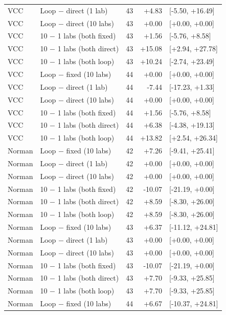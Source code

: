 \begin{longtable}{llrrl}
VCC & Loop $-$ direct (1 lab) & 43 & +4.83 & [-5.50, +16.49] \\
VCC & Loop $-$ direct (10 labs) & 43 & +0.00 & [+0.00, +0.00] \\
VCC & 10 $-$ 1 labs (both fixed) & 43 & +1.56 & [-5.76, +8.58] \\
VCC & 10 $-$ 1 labs (both direct) & 43 & +15.08 & [+2.94, +27.78] \\
VCC & 10 $-$ 1 labs (both loop) & 43 & +10.24 & [-2.74, +23.49] \\
\midrule
VCC & Loop $-$ fixed (10 labs) & 44 & +0.00 & [+0.00, +0.00] \\
VCC & Loop $-$ direct (1 lab) & 44 & -7.44 & [-17.23, +1.33] \\
VCC & Loop $-$ direct (10 labs) & 44 & +0.00 & [+0.00, +0.00] \\
VCC & 10 $-$ 1 labs (both fixed) & 44 & +1.56 & [-5.76, +8.58] \\
VCC & 10 $-$ 1 labs (both direct) & 44 & +6.38 & [-4.38, +19.13] \\
VCC & 10 $-$ 1 labs (both loop) & 44 & +13.82 & [+2.54, +26.34] \\
\midrule
Norman & Loop $-$ fixed (10 labs) & 42 & +7.26 & [-9.41, +25.41] \\
Norman & Loop $-$ direct (1 lab) & 42 & +0.00 & [+0.00, +0.00] \\
Norman & Loop $-$ direct (10 labs) & 42 & +0.00 & [+0.00, +0.00] \\
Norman & 10 $-$ 1 labs (both fixed) & 42 & -10.07 & [-21.19, +0.00] \\
Norman & 10 $-$ 1 labs (both direct) & 42 & +8.59 & [-8.30, +26.00] \\
Norman & 10 $-$ 1 labs (both loop) & 42 & +8.59 & [-8.30, +26.00] \\
\midrule
Norman & Loop $-$ fixed (10 labs) & 43 & +6.37 & [-11.12, +24.81] \\
Norman & Loop $-$ direct (1 lab) & 43 & +0.00 & [+0.00, +0.00] \\
Norman & Loop $-$ direct (10 labs) & 43 & +0.00 & [+0.00, +0.00] \\
Norman & 10 $-$ 1 labs (both fixed) & 43 & -10.07 & [-21.19, +0.00] \\
Norman & 10 $-$ 1 labs (both direct) & 43 & +7.70 & [-9.33, +25.85] \\
Norman & 10 $-$ 1 labs (both loop) & 43 & +7.70 & [-9.33, +25.85] \\
\midrule
Norman & Loop $-$ fixed (10 labs) & 44 & +6.67 & [-10.37, +24.81] \\

\end{longtable}
